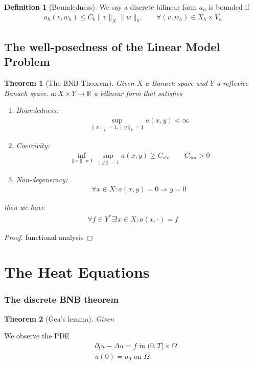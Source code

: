 \documentclass[a4paper,12pt,oneside,fleqn]{book}
\newtheorem{theorem}{Theorem}[section]
\theoremstyle{definition}
\newtheorem{definition}{Definition}[section]
\theoremstyle{remark}
\begin{document}
\begin{definition}[Boundedness]
	We say a discrete bilinear form $a_h$ is bounded if
	\begin{align*}
		a_h(v, w_h) \le C_b \|v\|_X \|w\|_V \qquad \forall (v, w_h) \in X_h \times V_h
	\end{align*}
\end{definition}
\subsection{The well-posedness of the Linear Model Problem}
\begin{theorem}[The BNB Theorem]
	Given $X$ a Banach space and $Y$ a reflexive Banach space. $a: X \times Y \rightarrow \mathbb{R}$ a bilinear form that satisfies
	\begin{enumerate}
		\item Boundedness:
		\begin{align*}
			\sup_{\|x\|_X = 1, \|y\|_Y = 1} a(x , y ) < \infty
		\end{align*}
		\item Coercivity:
		\begin{align*}
			\inf_{\|x\|= 1} \sup_{\|y\| = 1} a(x, y) \ge C_{sta} \qquad C_{sta} > 0
		\end{align*}
		\item Non-degeneracy:
		\begin{align*}
		\forall x \in X: a(x, y) = 0 \Rightarrow y = 0
		\end{align*}
	\end{enumerate}
	then we have
	\begin{align*}
		\forall f \in Y^* \exists ! x \in X: a(x, \cdot) = f
	\end{align*}
\end{theorem}
\begin{proof}
	functional analysis
\end{proof}


\section{The Heat Equations }
\subsubsection{The discrete BNB theorem}
\begin{theorem}[Gea's lemma]
	Given 
\end{theorem}
We observe the PDE
\begin{align*}
	& \partial_t u - \Delta u = f \text{ in } (0, T] \times \Omega\\
	& u(0) = u_0 \text{ on } \Omega
\end{align*}
\end{document}
